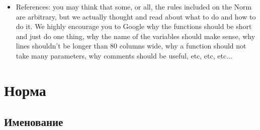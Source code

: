 \documentclass{42-ru}
\begin{document}
\begin{itemize}
    \item References: you may think that some, or all, the rules included on the Norm are
      arbitrary, but we actually thought and read about what to do and how to do it. We highly
      encourage you to Google why the functions should be short and just do one thing, why the
      name of the variables should make sense, why lines shouldn't be longer than 80 columns wide,
      why a function should not take many parameters, why comments should be useful, etc, etc, etc...

    \end{itemize}


\newpage

\chapter{Норма}


    \section{Именование}
\end{document}
